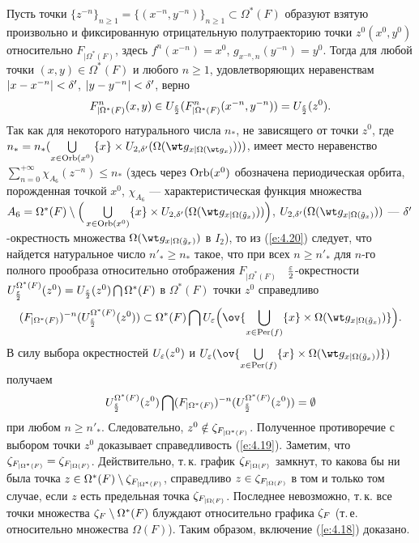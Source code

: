 Пусть точки
$\{z^{-n}\}_{n\geq 1}=\{(x^{-n}, y^{-n})\}_{n\geq 1}
\subset\Omega^*(F)$
образуют взятую произвольно и фиксированную
отрицательную полутраекторию точки
$z^0(x^0, y^0)$ относительно
$F_{|\Omega^*(F)}$, здесь
$f^n(x^{-n})=x^0$, $g_{x^{-n}, n}(y^{-n})=y^0$.
Тогда для любой точки $(x, y)\in \Omega^*(F)$ и любого $n\geq 1$,
удовлетворяющих неравенствам
$|x - x^{-n}|<\delta'$, $|y - y^{-n}|<\delta'$, верно
\begin{equation}\label{e:4.20}
F_{|\Omega^*(F)}^n(x, y)\in U_{\frac{\varepsilon}{2}}
(F_{|\Omega^*(F)}^n(x^{-n}, y^{-n}))
=U_{\frac{\varepsilon}{2}}(z^0).
\end{equation}
Так как для некоторого натурального числа $n_*$, не зависящего от точки
$z^0$, где $n_*=n_*(\bigcup\limits_{x\in \Orb(x^0)}\{x\}
\times U_{2, \de'}(\Omega(\wt g_{x|\Omega(\wt g_x)})))$,
имеет место неравенство
$\sum\limits_{n=0}^{+\infty}\chi_{A_6}(z^{-n})\leq n_*$
(здесь через $\operatorname{Orb}(x^0)$ обозначена периодическая орбита,
порожденная точкой $x^0$, $\chi_{A_6}$
--- характеристическая функция множества
$A_6=\Omega^*(F)\setminus
\Big(\bigcup\limits_{x\in \Orb(x^0)}\{x\}\times
U_{2, \de'} (\Omega(\wt g_{x|\Omega(\Tilde g_x)}))\Big)$,
$U_{2, \de'} (\Omega(\wt g_{x|\Omega(\Tilde g_x)}))$
--- $\delta'$-окрестность множества
$\Omega(\wt g_{x|\Omega(\Tilde g_x)})$ в $I_2$),
то из (\ref{e:4.20}) следует, что найдется натуральное
число $n'_*\geq n_*$ такое, что при всех $n\geq n'_*$
для $n$-го полного прообраза относительно отображения
$F_{| \Omega^*(F)}$  \  $\frac{\varepsilon}{2}$-окрестности
$U_{\frac{\varepsilon}{2}}^{\Omega^*(F)}(z^0)=U_{\frac{\varepsilon}{2}}(z^0)
\bigcap\Omega^*(F)$ в $\Omega^*(F)$ точки $z^0$
справедливо
$$
(F_{| \Omega^*(F)})^{-n}
(U_{\frac{\e}{2}}^{\Omega^*(F)}(z^0))\subset\Omega^*(F)\bigcap U_{\e}
\Big(\ov{\bigcup\limits_{x\in \Per(f)}
\{x\}\times\Omega(\wt g_{x|\Omega(\Tilde g_x)})}\Big).
$$
В силу выбора окрестностей $U_{\varepsilon}(z^0)$ и 
$U_{\e}(\ov{\bigcup\limits_{x\in \Per(f)}
\{x\}\times\Omega(\wt g_{x|\Omega(\Tilde g_x)})})$
получаем
$$
U_{\frac{\varepsilon}{2}}^{\Omega^*(F)}(z^0)\bigcap
(F_{| \Omega^*(F)})^{-n}
(U_{\frac{\varepsilon}{2}}^{\Omega^*(F)}(z^0))=\emptyset
$$
при любом $n\geq n'_*$. Следовательно,
$z^0\notin\zeta_{F_{|\Omega^*(F)}}$.
Полученное противоречие с выбором точки $z^0$
доказывает справедливость (\ref{e:4.19}).
Заметим, что $\zeta_{F_{|\Omega^*(F)}}=\zeta_{F_{|\Omega(F)}}$.
Действительно, т.\,к. график
$\zeta_{F_{|\Omega(F)}}$ замкнут, то какова бы ни была точка
$z\in\Omega^*(F)\setminus\zeta_{F_{|\Omega^*(F)}}$, справедливо
$z\in\zeta_{F_{|\Omega(F)}}$ в том и только том случае, если
$z$ есть предельная точка $\zeta_{F_{|\Omega(F)}}$.
Последнее невозможно, т.\,к. все точки множества
$\zeta_F\setminus\Omega^*(F)$ блуждают относительно
графика $\zeta_F$ (т.\,е. относительно множества $\Omega(F)$).
Таким образом, включение (\ref{e:4.18}) доказано.

